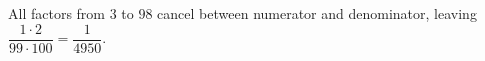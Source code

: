 All factors from $3$ to $98$ cancel between numerator and denominator, leaving $\dfrac{1\cdot2}{99\cdot100}=\boxed{\dfrac{1}{4950}}$.
